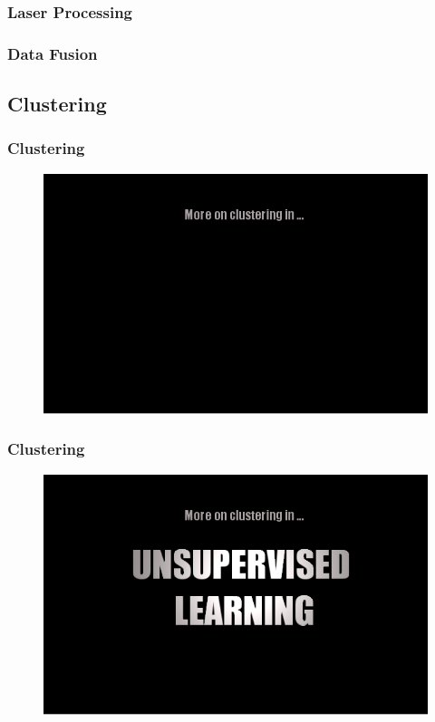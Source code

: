 \documentclass[table]{beamer}
\begin{document}
\subsubsection{Laser Processing}
\frame{}
\subsubsection{Data Fusion}
\frame{}

\subsection{Clustering}
\frame
{
	\frametitle{Clustering}
	\begin{figure}
		\includegraphics[scale=0.45]{fig/ulcs1.png}		
	\end{figure}
}
\frame
{
	\frametitle{Clustering}
	\begin{figure}
		\includegraphics[scale=0.45]{fig/ulcs2.png}		
	\end{figure}
}
\frame
\end{document}
